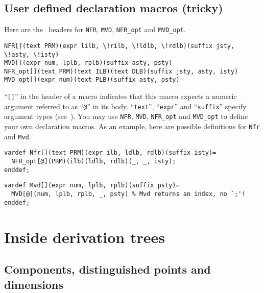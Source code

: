 \documentclass[twoside,11pt]{article}
\begin{document}
\subsection{User defined declaration macros (tricky)\label{sec-user-defined}}
%
%
Here are the \MP\ headers for \texttt{NFR}, \texttt{MVD}, \texttt{NFR\_opt} and
\texttt{MVD\_opt}.
\begin{Verbatim}[commandchars=\\\{\}]
NFR[](text PRM)(expr lilb, \!rilb, \!ldlb, \!rdlb)(suffix jsty, \!asty, \!isty)
MVD[](expr num, lplb, rplb)(suffix asty, psty)
NFR_opt[](text PRM)(text ILB)(text DLB)(suffix jsty, asty, isty)
MVD_opt[](expr num)(text PLB)(suffix asty, psty)
\end{Verbatim}
``\texttt{[]}'' in the header of a macro indicates that this macro expects a
numeric argument referred to as ``\texttt{@}'' in its body.
``\texttt{text}'', ``\texttt{expr}'' and ``\texttt{suffix}'' specify argument
types (see~\cite[Section 10]{hobby09}). You may use \texttt{NFR}, \texttt{MVD},
\texttt{NFR\_opt} and \texttt{MVD\_opt} to define your own declaration macros.
As an example, here are possible definitions for \texttt{Nfr} and \texttt{Mvd}.
\begin{Verbatim}
vardef Nfr[](text PRM)(expr ilb, ldlb, rdlb)(suffix isty)=
  NFR_opt[@](PRM)(ilb)(ldlb, rdlb)(_, _, isty);
enddef;
\end{Verbatim}
\begin{Verbatim}
vardef Mvd[](expr num, lplb, rplb)(suffix psty)=
  MVD[@](num, lplb, rplb, _, psty) % Mvd returns an index, no `;'!
enddef;
\end{Verbatim}
%
%
\section{Inside derivation trees\label{sec-inside}}
%
%
\subsection{Components, distinguished points and
dimensions\label{sec-components}}
%
%
\end{document}
